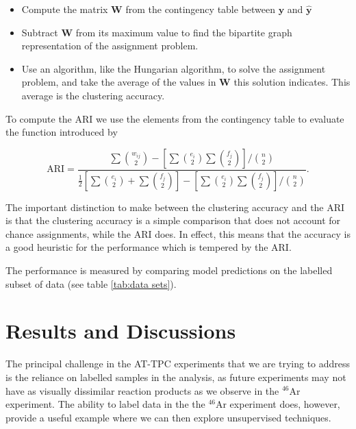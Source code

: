 \documentclass[review,number,sort&compress]{elsarticle}
\begin{document}
\begin{itemize}
    \item Compute the matrix $\mathbf{W}$ from the contingency table between $\mathbf{y}$ and $\mathbf{\hat{y}}$
    \item Subtract $\mathbf{W}$ from its maximum value to find the bipartite graph representation of the assignment problem.
    \item Use an algorithm, like the Hungarian algorithm, to solve the assignment problem, and take the average of the values in $\mathbf{W}$ this solution indicates. This average is the clustering accuracy. 
\end{itemize}

To compute the ARI we use the elements from the contingency table to evaluate the function introduced by \citet{Hubert1985}

\begin{equation}\label{eq:ari}
\text{ARI} = \frac{\sum  \binom{w_{ij}}{2} - \left[\sum  \binom{e_{i}}{2} \sum  \binom{f_{j}}{2}  \right]/\binom{n}{2}}{\frac{1}{2}\left[\sum  \binom{e_{i}}{2} + \sum  \binom{f_{j}}{2}  \right]- \left[\sum  \binom{e_{i}}{2} \sum  \binom{f_{j}}{2}  \right]/\binom{n}{2}}.
\end{equation}

The important distinction to make between the clustering accuracy and the ARI is that the clustering accuracy is a simple comparison that does not account for chance assignments, while the ARI does. In effect, this means that the accuracy is a good heuristic for the performance which is tempered by the ARI. 

The performance is measured by comparing model predictions on the labelled subset of data (see table \ref{tab:data sets}).


\section{Results and Discussions}\label{sec:results}

The principal challenge in the AT-TPC experiments that we are trying to address is the reliance on labelled samples in the analysis, as future experiments may not have as visually dissimilar reaction products as we observe in the ${}^{46}$Ar experiment.  The ability to label data in the the ${}^{46}$Ar experiment does, however, provide a useful example where we can then explore unsupervised techniques. 
\end{document}
